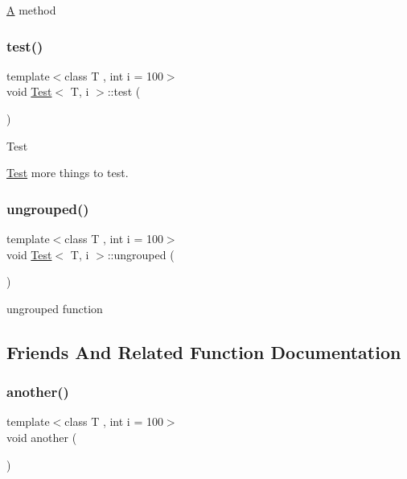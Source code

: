 \mbox{\hyperlink{class_a}{A}} method \mbox{\label{class_test_a4cb7b5dcc0c62cea42975109dcd9208b}} 
\subsubsection{\texorpdfstring{test()}{test()}}
{\footnotesize\ttfamily template$<$class T , int i = 100$>$ \\
void \mbox{\hyperlink{class_test}{Test}}$<$ T, i $>$\+::test (\begin{DoxyParamCaption}{ }\end{DoxyParamCaption})}

\begin{DoxyRefDesc}{Test}
\item[\mbox{\hyperlink{test__test000002}{Test}}]more things to test. \end{DoxyRefDesc}
\mbox{\label{class_test_a2671fd85c5d94331067a9175ed326479}} 
\subsubsection{\texorpdfstring{ungrouped()}{ungrouped()}}
{\footnotesize\ttfamily template$<$class T , int i = 100$>$ \\
void \mbox{\hyperlink{class_test}{Test}}$<$ T, i $>$\+::ungrouped (\begin{DoxyParamCaption}{ }\end{DoxyParamCaption})}

ungrouped function 

\subsection{Friends And Related Function Documentation}
\mbox{\label{class_test_a1283d836e0611ff772c1b06a31ecbbfe}} 
\subsubsection{\texorpdfstring{another()}{another()}}
{\footnotesize\ttfamily template$<$class T , int i = 100$>$ \\
void another (\begin{DoxyParamCaption}{ }\end{DoxyParamCaption})\hspace{0.3cm}{\ttfamily [related]}}

